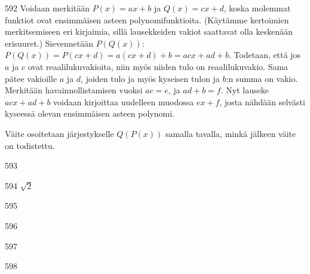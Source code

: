 \begin{Vastaus}{592}
Voidaan merkitään $P(x)=ax+b$ ja $Q(x)=cx+d$, koska molemmat funktiot ovat ensimmäisen asteen polynomifunktioita. (Käytämme kertoimien merkitsemiseen eri kirjaimia, sillä lausekkeiden vakiot saattavat olla keskenään erisuuret.) Sievennetään $P(Q(x))$: $P(Q(x))=P(cx+d)=a(cx+d)+b=acx+ad+b$. Todetaan, että jos $a$ ja $c$ ovat reaalilukuvakioita, niin myös niiden tulo on reaalilukuvakio. Sama pätee vakioille $a$ ja $d$, joiden tulo ja myös kyseisen tulon ja $b$:n summa on vakio. Merkitään havainnollistamisen vuoksi $ac=e$, ja $ad+b=f$. Nyt lauseke $acx+ad+b$ voidaan kirjoittaa uudelleen muodossa $ex+f$, josta nähdään selvästi kyseessä olevan ensimmäisen asteen polynomi.

Väite osoitetaan järjestykselle $Q(P(x))$ samalla tavalla, minkä jälkeen väite on todistettu.

	
\end{Vastaus}
\begin{Vastaus}{593}
	
\end{Vastaus}
\begin{Vastaus}{594}
$\sqrt{2}$
	
\end{Vastaus}
\begin{Vastaus}{595}
    
\end{Vastaus}
\begin{Vastaus}{596}
    
\end{Vastaus}
\begin{Vastaus}{597}
    
\end{Vastaus}
\begin{Vastaus}{598}
    
\end{Vastaus}

